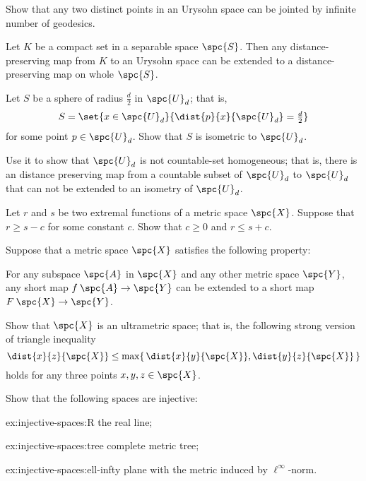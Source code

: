 \newpage
\pagestyle{empty}

\noindent Show that any two distinct points in an Urysohn space can be jointed by infinite number of geodesics.

\vskip 50mm

\noindent 
Let $K$ be a compact set in a separable space $\spc{S}$.
Then any distance-preserving map from $K$ to an Urysohn space can be extended to 
a distance-preserving map on whole $\spc{S}$.


\vskip 50mm

\noindent Let $S$ be a sphere of radius $\tfrac d2$ in $\spc{U}_d$;
that is, 
\[S=\set{x\in \spc{U}_d}{\dist{p}{x}{\spc{U}_d}=\tfrac d2}\]
for some point $p\in \spc{U}_d$.
Show that $S$ is isometric to $\spc{U}_d$.

Use it to show that $\spc{U}_d$ is not countable-set homogeneous;
that is, there is an distance preserving map from a countable subset of $\spc{U}_d$ to $\spc{U}_d$ that can not be extended to an isometry of $\spc{U}_d$.

\newpage
\pagestyle{empty}

\noindent Let $r$ and $s$ be two extremal functions of a metric space $\spc{X}$.
Suppose that $r\ge s-c$ for some constant $c$.
Show that $c\ge 0$ and $r\le s+c$.

\vskip 50mm

\noindent Suppose that a metric space $\spc{X}$ satisfies the following property:

For any subspace $\spc{A}$ in $\spc{X}$ and any other metric space $\spc{Y}$, any short map $f\:\spc{A}\to \spc{Y}$ can be extended to a short map $F\:\spc{X}\to \spc{Y}$.

Show that $\spc{X}$ is an ultrametric space;
that is, the following strong version of triangle inequality
\[\dist{x}{z}{\spc{X}}
\le
\max\{\,\dist{x}{y}{\spc{X}},\dist{y}{z}{\spc{X}}\,\}\]
holds for any three points $x,y,z\in \spc{X}$.

\vskip 50mm

\noindent Show that the following spaces are injective:
\begin{subthm}{ex:injective-spaces:R}
the real line;
\end{subthm}

\begin{subthm}{ex:injective-spaces:tree}
complete metric tree;
\end{subthm}

\begin{subthm}{ex:injective-spaces:ell-infty}
plane with the metric induced by $\ell^\infty$-norm.
\end{subthm}

